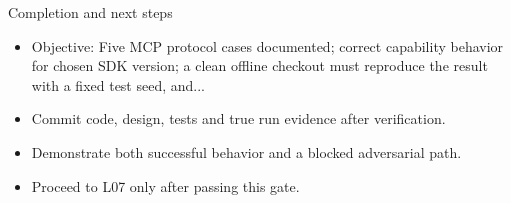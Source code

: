 \documentclass[aspectratio=169,10pt]{beamer}
\begin{document}
\begin{frame}{Completion and next steps}
\small
\begin{itemize}
\item Objective: Five MCP protocol cases documented; correct capability behavior for chosen SDK version; a clean offline checkout must reproduce the result with a fixed test seed, and...
\item Commit code, design, tests and true run evidence after verification.
\item Demonstrate both successful behavior and a blocked adversarial path.
\item Proceed to L07 only after passing this gate.
\end{itemize}

\end{frame}
\end{document}
